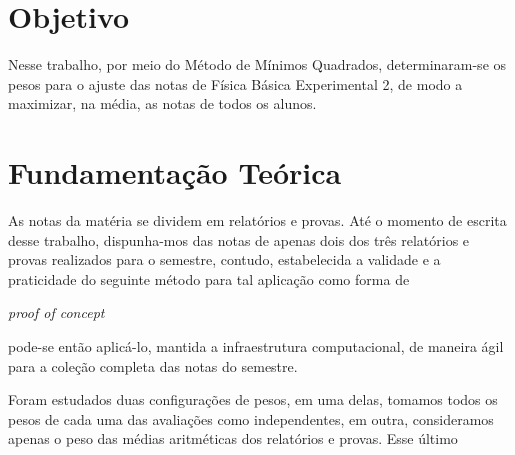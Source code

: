 \documentclass[11pt, twocolumn]{article}
\title{\vartitulo}
\author
{
        \varautor \\
        \varinstituicao \\
        \vardepartamento \\
        \varcontato
}
\date{}
\begin{document}



        \section{Objetivo}
		Nesse trabalho, por meio do Método de Mínimos
		Quadrados, determinaram-se os pesos para o 
		ajuste das notas de Física Básica Experimental 
		2, de modo a maximizar, na média, as notas de 
		todos os alunos.

        \section{Fundamentação Teórica}
		As notas da matéria se dividem em relatórios e 
		provas. Até o momento de escrita desse trabalho,
		dispunha-mos das notas de apenas dois dos três 
		relatórios e provas realizados para o semestre,
		contudo, estabelecida a validade e a praticidade
		do seguinte método para tal aplicação como 
		forma de 
		\begin{otherlanguage}{english}
			\textit{proof of concept}
		\end{otherlanguage}
		pode-se então aplicá-lo, mantida a 
		infraestrutura computacional, de maneira ágil 
		para a coleção completa das notas do semestre.

		Foram estudados duas configurações de pesos, em 
		uma delas, tomamos todos os pesos de cada uma 
		das avaliações como independentes, em outra, 
		consideramos apenas o peso das médias 
		aritméticas dos relatórios e provas. Esse último
		
\end{document}
